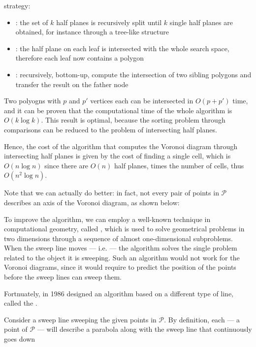 \documentclass[a4paper, 12pt]{report}
\begin{document}
strategy:

    \begin{itemize}
        \item {}: the set of $k$ half planes is recursively split until $k$ single half planes are obtained, for instance through a tree-like structure
        \item {}: the half plane on each leaf is intersected with the whole search space, therefore each leaf now contains a polygon
        \item {}: recursively, bottom-up, compute the intersection of two sibling polygons and transfer the result on the father node
    \end{itemize}

    Two polyogns with $p$ and $p'$ vertices each can be intersected in $O(p + p')$ time, and it can be proven that the computational time of the whole algorithm is $O(k \log k)$. This result is optimal, because the sorting problem through comparisons can be reduced to the problem of intersecting half planes.

    Hence, the cost of the algorithm that computes the Voronoi diagram through intersecting half planes is given by the cost of finding a single cell, which is $O(n \log n)$ since there are $O(n)$ half planes, times the number of cells, thus $O(n^2 \log n)$.

    Note that we can actually do better: in fact, not every pair of points in $\mathcal P$ describes an axis of the Voronoi diagram, as shown below:


    To improve the algorithm, we can employ a well-known technique in computational geometry, called , which is used to solve geometrical problems in two dimensions through a sequence of almost one-dimensional subproblems. When the sweep line moves --- i.e.  --- the algorithm solves the single problem related to the object it is sweeping. Such an algorithm would not work for the Voronoi diagrams, since it would require to predict the position of the points before the sweep lines can sweep them.

    Fortnuately, in 1986 \textcite{fortune} designed an algorithm based on a different type of line, called the .

    Consider a sweep line sweeping the given points in $\mathcal P$. By definition, each  --- a point of $\mathcal P$ ---  will describe a parabola along with the sweep line that continuously goes down
\end{document}
